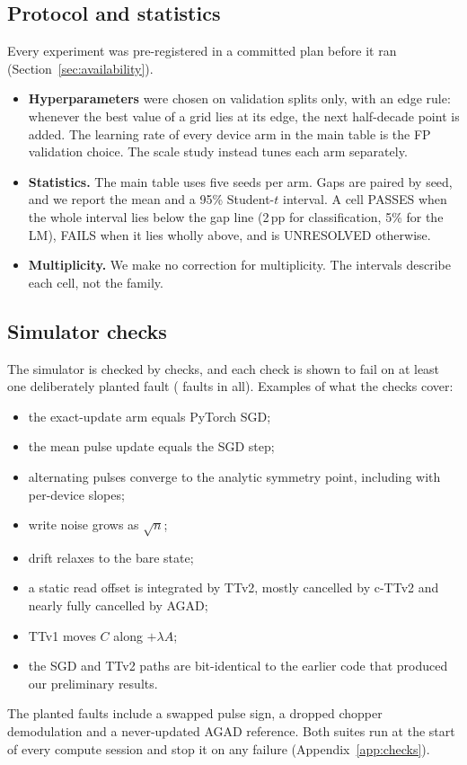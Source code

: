\subsection{Protocol and statistics}\label{sec:protocol}
Every experiment was pre-registered in a committed plan before it ran (Section~\ref{sec:availability}).
\begin{itemize}
\item \textbf{Hyperparameters} were chosen on validation splits only, with an edge rule: whenever the best value of a grid lies
      at its edge, the next half-decade point is added. The learning rate of every device arm in the main table is the FP
      validation choice. The scale study instead tunes each arm separately.
\item \textbf{Statistics.} The main table uses five seeds per arm. Gaps are paired by seed, and we report the mean and a 95\%
      Student-$t$ interval. A cell PASSES when the whole interval lies below the gap line (2\,pp for classification, 5\% for
      the LM), FAILS when it lies wholly above, and is UNRESOLVED otherwise.
\item \textbf{Multiplicity.} We make no correction for multiplicity. The intervals describe each cell, not the family.
\end{itemize}

\subsection{Simulator checks}\label{sec:checks}
The simulator is checked by \nChecks{} checks, and each check is shown to fail on at least one deliberately planted fault
(\nFaults{} faults in all). Examples of what the checks cover:
\begin{itemize}
\item the exact-update arm equals PyTorch SGD;
\item the mean pulse update equals the SGD step;
\item alternating pulses converge to the analytic symmetry point, including with per-device slopes;
\item write noise grows as $\sqrt n$;
\item drift relaxes to the bare state;
\item a static read offset is integrated by TTv2, mostly cancelled by c-TTv2 and nearly fully cancelled by AGAD;
\item TTv1 moves $C$ along $+\lambda A$;
\item the SGD and TTv2 paths are bit-identical to the earlier code that produced our preliminary results.
\end{itemize}
The planted faults include a swapped pulse sign, a dropped chopper demodulation and a never-updated AGAD reference.
Both suites run at the start of every compute session and stop it on any failure (Appendix~\ref{app:checks}).
